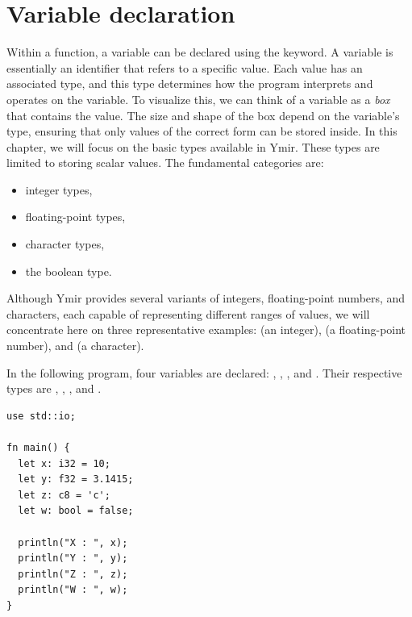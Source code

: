 \vfill\pagebreak
\section{Variable declaration}

Within a function, a variable can be declared using the  keyword. A
variable is essentially an identifier that refers to a specific value. Each
value has an associated type, and this type determines how the program
interprets and operates on the variable. To visualize this, we can think of a
variable as a \textit{box} that contains the value. The size and shape of the
box depend on the variable’s type, ensuring that only values of the correct form
can be stored inside. In this chapter, we will focus on the basic types
available in Ymir. These types are limited to storing scalar values. The
fundamental categories are:

\vspace{-10pt}%
\begin{itemize}
\setlength\itemsep{0.2mm}
\item integer types,
\item floating-point types,
\item character types,
\item the boolean type.
\end{itemize}\vspace{-10pt}%

Although Ymir provides several variants of integers, floating-point numbers, and
characters, each capable of representing different ranges of values, we will
concentrate here on three representative examples:  (an integer),
 (a floating-point number), and  (a character).


In the following program, four variables are declared: , ,
, and . Their respective types are , ,
, and .

\begin{lstlisting}[style=coloredverbatim, caption=simple variable declaration, label=lst:(chap2):basic_variables]
use std::io;

fn main() {
  let x: i32 = 10;
  let y: f32 = 3.1415;
  let z: c8 = 'c';
  let w: bool = false;

  println("X : ", x);
  println("Y : ", y);
  println("Z : ", z);
  println("W : ", w);
}
\end{lstlisting}



